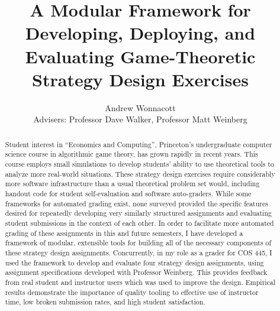 \documentclass[pageno]{jpaper}
\begin{document}
\title{
A Modular Framework for Developing, Deploying, and Evaluating Game-Theoretic Strategy Design Exercises}

\author{Andrew Wonnacott\\
  Advisers: Professor Dave Walker, Professor Matt Weinberg}

\date{}
\maketitle

\thispagestyle{empty}
\doublespacing{}
\begin{abstract}
  Student interest in ``Economics and Computing'', Princeton's undergraduate computer science course in algorithmic game theory, has grown rapidly in recent years.
  This course employs small simulations to develop students' ability to use theoretical tools to analyze more real-world situations.
  These strategy design exercises require considerably more software infrastructure than a usual theoretical problem set would, including handout code for student self-evaluation and software auto-graders.
  While some frameworks for automated grading exist, none surveyed provided the specific features desired for repeatedly developing very similarly structured assignments and evaluating student submissions in the context of each other.
  In order to facilitate more automated grading of these assignments in this and future semesters, I have developed a framework of modular, extensible tools for building all of the necessary components of these strategy design assignments.
  Concurrently, in my role as a grader for COS 445, I used the framework to develop and evaluate four strategy design assignments, using assignment specifications developed with Professor Weinberg.
  This provides feedback from real student and instructor users which was used to improve the design.
  Empirical results demonstrate the importance of quality tooling to effective use of instructor time, low broken submission rates, and high student satisfaction.
\end{abstract}

\newpage
\end{document}
